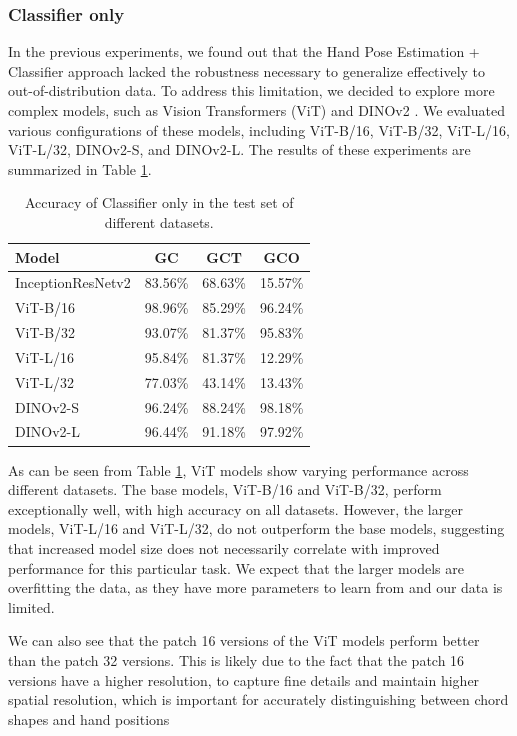 \documentclass[10pt,twocolumn,letterpaper]{article}
\begin{document}
\subsubsection{Classifier only}
In the previous experiments, we found out that the Hand Pose Estimation + Classifier approach lacked the robustness necessary to generalize effectively to out-of-distribution data. To address this limitation, we decided to explore more complex models, such as Vision Transformers (ViT) \cite{dosovitskiy2020image} and DINOv2 \cite{oquab2023dinov2}. We evaluated various configurations of these models, including ViT-B/16, ViT-B/32, ViT-L/16, ViT-L/32, DINOv2-S, and DINOv2-L. The results of these experiments are summarized in Table \ref{tab:transformer-models-results}.

\begin{table}[h]
  \centering
  \begin{tabular}{lccc}
    \toprule
    \textbf{Model} & \textbf{GC} & \textbf{GCT} & \textbf{GCO} \\
    \midrule
    InceptionResNetv2 & 83.56\% & 68.63\% & 15.57\% \\
    \midrule
    ViT-B/16 & 98.96\% & 85.29\% & 96.24\% \\
    ViT-B/32 & 93.07\% & 81.37\% & 95.83\% \\
    ViT-L/16 & 95.84\% & 81.37\% & 12.29\% \\
    ViT-L/32 & 77.03\% & 43.14\% & 13.43\% \\
    DINOv2-S & 96.24\% & 88.24\% & 98.18\% \\
    DINOv2-L & 96.44\% & 91.18\% & 97.92\% \\
    \bottomrule
  \end{tabular}
  \caption{Accuracy of Classifier only in the test set of different datasets.}
  \label{tab:transformer-models-results}
\end{table}

As can be seen from Table \ref{tab:transformer-models-results}, ViT models show varying performance across different datasets. The base models, ViT-B/16 and ViT-B/32, perform exceptionally well, with high accuracy on all datasets. However, the larger models, ViT-L/16 and ViT-L/32, do not outperform the base models, suggesting that increased model size does not necessarily correlate with improved performance for this particular task. We expect that the larger models are overfitting the data, as they have more parameters to learn from and our data is limited.

We can also see that the patch 16 versions of the ViT models perform better than the patch 32 versions. This is likely due to the fact that the patch 16 versions have a higher resolution, to capture fine details and maintain higher spatial resolution, which is important for accurately distinguishing between chord shapes and hand positions
\end{document}
